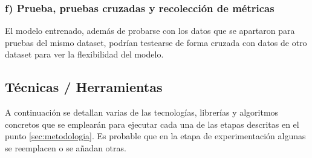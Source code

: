 \documentclass[12pt]{article}
\begin{document}
\subsubsection*{f) Prueba, pruebas cruzadas y recolección de métricas}
El modelo entrenado, además de probarse con los datos que se apartaron para pruebas del mismo dataset, podrían testearse  de forma cruzada con datos de otro dataset para ver la flexibilidad del modelo.


\subsection{Técnicas / Herramientas}

A continuación se detallan varias de las tecnologías, librerías y algoritmos concretos que se emplearán para ejecutar cada una de las etapas descritas en el punto \ref{sec:metodologia}. Es probable que en la etapa de experimentación algunas se reemplacen o se añadan otras.
\end{document}
